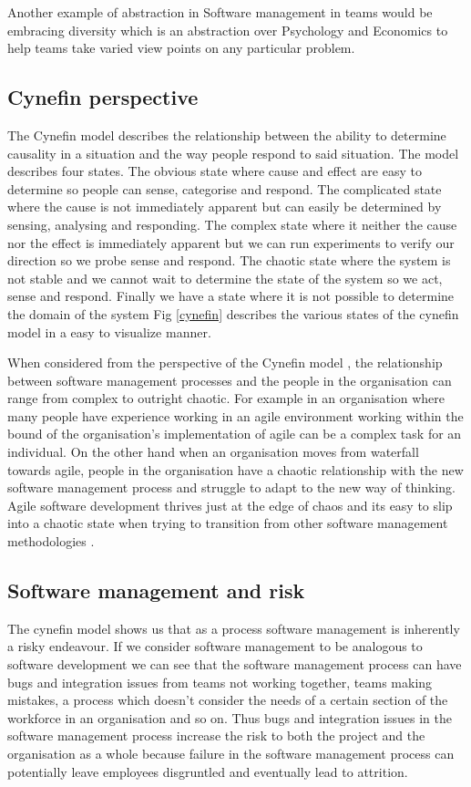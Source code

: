 \documentclass[12pt,conference]{IEEEtran}
\begin{document}
Another example of abstraction in Software management in teams would be embracing diversity which is an abstraction over Psychology and Economics to help teams take varied view points on any particular problem. 

\subsection*{Cynefin perspective}

The Cynefin model describes the relationship between the ability to determine causality in a situation and the way people respond to said situation. The model describes four states. The obvious state where cause and effect are easy to determine so people can sense, categorise and respond. The complicated state where the cause is not immediately apparent but can easily be determined by sensing, analysing and responding. The complex state where it neither the cause nor the effect is immediately apparent but we can run experiments to verify our direction so we probe sense and respond. The chaotic state where the system is not stable and we cannot wait to determine the state of the system so we act, sense and respond. Finally we have a state where it is not possible to determine the domain of the system
Fig \ref{cynefin} describes the various states of the cynefin model in a easy to visualize manner.

When considered from the perspective of the Cynefin model \cite{snowden_cynefin_????}, the relationship between software management processes and the people in the organisation can range from complex to outright chaotic. For example in an organisation where many people have experience working in an agile environment working within the bound of the organisation's implementation of agile can be a complex task for an individual. On the other hand when an organisation moves from waterfall towards agile, people in the organisation have a chaotic relationship with the new software management process and struggle to adapt to the new way of thinking. Agile software development thrives just at the edge of chaos and its easy to slip into a chaotic state when trying to transition from other software management methodologies \cite{kautz_just_2008}. 

\subsection*{Software management and risk}

The cynefin model shows us that as a process software management is inherently a risky endeavour. If we consider software management to be analogous to software development we can see that the software management process can have bugs and integration issues from teams not working together, teams making mistakes, a process which doesn't consider the needs of a certain section of the workforce in an organisation and so on. Thus bugs and integration issues in the software management process increase the risk to both the project and the organisation as a whole because failure in the software management process can potentially leave employees disgruntled and eventually lead to attrition. 
\end{document}
